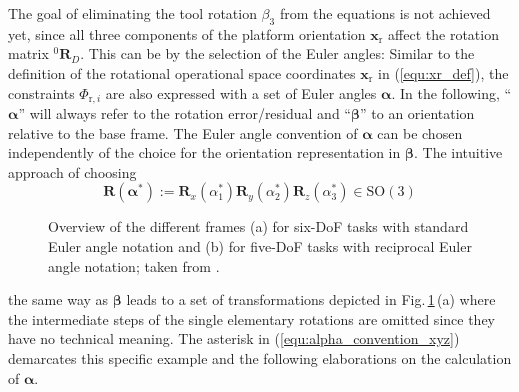 \documentclass[robotics,article,submit,moreauthors,pdftex]{Definitions/mdpi}
\newcommand{\bm}[1]{\boldsymbol{#1}}
\newcommand{\rotmat}[2]{{{ }^{#1}\boldsymbol{R}}_{#2}}
\let\Phi\varPhi
\begin{document}
The goal of eliminating the tool rotation $\beta_3$ from the equations is not achieved yet, since all three components of the platform orientation $\bm{x}_\mathrm{r}$ affect the rotation matrix $\rotmat{0}{D}$.
This can be  by the selection of the Euler angles:
Similar to the definition of the rotational operational space coordinates $\bm{x}_\mathrm{r}$ in (\ref{equ:xr_def}), the constraints $\bm{\Phi}_{\mathrm{r},i}$ are also expressed with a set of Euler angles $\bm{\alpha}$.
In the following, ``$\bm{\alpha}$'' will always refer to the rotation error/residual and ``$\bm{\beta}$'' to an orientation relative to the base frame.
The Euler angle convention of $\bm{\alpha}$ can be chosen independently of the choice for the orientation representation in $\bm{\beta}$.
The intuitive approach of choosing
%
\begin{equation}
\bm{R}(\bm{\alpha}^*) := \bm{R}_x(\alpha_1^*) \bm{R}_y(\alpha_2^*) \bm{R}_z(\alpha_3^*) \in \mathrm{SO(3)}
\label{equ:alpha_convention_xyz}
\end{equation}
%
\begin{figure}[b]
    
    \caption{Overview of the different frames (a) for six-DoF tasks with standard Euler angle notation and (b) for five-DoF tasks with reciprocal Euler angle notation; taken from \cite{1_SchapplerTapOrt2019}.}
    \label{fig:frames_5dof_6dof}
\end{figure} 
%
%
the same way as $\bm{\beta}$ leads to a set of transformations depicted in Fig.\,\ref{fig:frames_5dof_6dof}\,(a) where the intermediate steps of the single elementary rotations are omitted since they have no technical meaning.
The  asterisk in (\ref{equ:alpha_convention_xyz}) demarcates this specific example and the following elaborations on the calculation of $\bm{\alpha}$.
\end{document}
